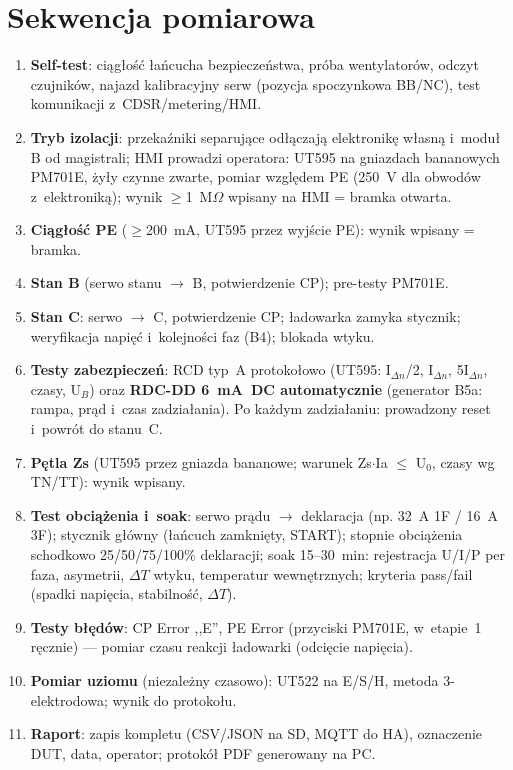\documentclass[11pt,a4paper]{article}
\newcommand{\ohm}{$\Omega$}
\begin{document}
\section{Sekwencja pomiarowa}
\label{sec:sekwencja}

\begin{enumerate}
\item \textbf{Self-test}: ciągłość łańcucha bezpieczeństwa, próba wentylatorów, odczyt czujników, najazd kalibracyjny serw (pozycja spoczynkowa BB/NC), test komunikacji z~CDSR/metering/HMI.
\item \textbf{Tryb izolacji}: przekaźniki separujące odłączają elektronikę własną i~moduł B od magistrali; HMI prowadzi operatora: UT595 na gniazdach bananowych PM701E, żyły czynne zwarte, pomiar względem PE (250~V dla obwodów z~elektroniką); wynik $\ge$1~M\ohm{} wpisany na HMI = bramka otwarta.
\item \textbf{Ciągłość PE} ($\ge$200~mA, UT595 przez wyjście PE): wynik wpisany = bramka.
\item \textbf{Stan B} (serwo stanu $\rightarrow$ B, potwierdzenie CP); pre-testy PM701E.
\item \textbf{Stan C}: serwo $\rightarrow$ C, potwierdzenie CP; ładowarka zamyka stycznik; weryfikacja napięć i~kolejności faz (B4); blokada wtyku.
\item \textbf{Testy zabezpieczeń}: RCD typ~A protokołowo (UT595: I$_{\Delta n}$/2, I$_{\Delta n}$, 5I$_{\Delta n}$, czasy, U$_B$) oraz \textbf{RDC-DD 6~mA~DC automatycznie} (generator B5a: rampa, prąd i~czas zadziałania). Po każdym zadziałaniu: prowadzony reset i~powrót do stanu~C.
\item \textbf{Pętla Zs} (UT595 przez gniazda bananowe; warunek Zs$\cdot$Ia $\le$ U$_0$, czasy wg TN/TT): wynik wpisany.
\item \textbf{Test obciążenia i~soak}: serwo prądu $\rightarrow$ deklaracja (np. 32~A 1F / 16~A 3F); stycznik główny (łańcuch zamknięty, START); stopnie obciążenia schodkowo 25/50/75/100\% deklaracji; soak 15--30~min: rejestracja U/I/P per faza, asymetrii, $\Delta T$ wtyku, temperatur wewnętrznych; kryteria pass/fail (spadki napięcia, stabilność, $\Delta T$).
\item \textbf{Testy błędów}: CP Error ,,E'', PE Error (przyciski PM701E, w~etapie~1 ręcznie) --- pomiar czasu reakcji ładowarki (odcięcie napięcia).
\item \textbf{Pomiar uziomu} (niezależny czasowo): UT522 na E/S/H, metoda 3-elektrodowa; wynik do protokołu.
\item \textbf{Raport}: zapis kompletu (CSV/JSON na SD, MQTT do HA), oznaczenie DUT, data, operator; protokół PDF generowany na PC.
\end{enumerate}
\end{document}
